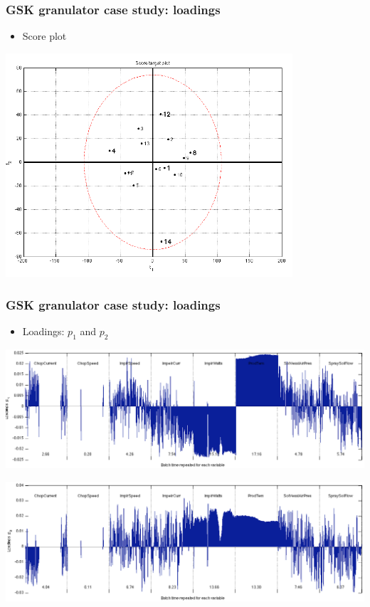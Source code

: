 \begin{frame}\frametitle{GSK granulator case study: loadings}
	
	\begin{itemize}
		\item	Score plot
	\end{itemize}
	\begin{center}
		\includegraphics[width=0.8\textwidth]{images/gsk/GSK-score-plot.png}
	\end{center}
	
\end{frame}

\begin{frame}\frametitle{GSK granulator case study: loadings}
	
	\begin{itemize}
		\item	Loadings: \( p_1  \) and \( p_2 \)
	\end{itemize}
	\begin{center}
		\includegraphics[width=\textwidth]{images/gsk/GSK-loadings-p1.png}
	\end{center}
	\begin{center}
		\includegraphics[width=\textwidth]{images/gsk/GSK-loadings-p2.png}
	\end{center}
\end{frame}

